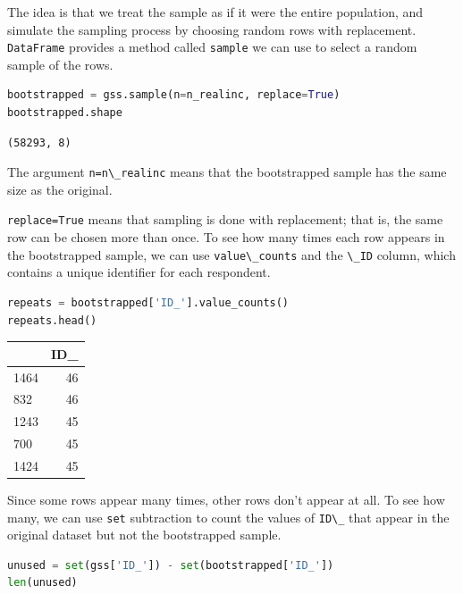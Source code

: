 The idea is that we treat the sample as if it were the entire
population, and simulate the sampling process by choosing random rows
with replacement. \passthrough{\lstinline!DataFrame!} provides a method
called \passthrough{\lstinline!sample!} we can use to select a random
sample of the rows.

\begin{lstlisting}[language=Python]
bootstrapped = gss.sample(n=n_realinc, replace=True)
bootstrapped.shape
\end{lstlisting}

\begin{lstlisting}[]
(58293, 8)
\end{lstlisting}

The argument \passthrough{\lstinline!n=n\_realinc!} means that the
bootstrapped sample has the same size as the original.

\passthrough{\lstinline!replace=True!} means that sampling is done with
replacement; that is, the same row can be chosen more than once. To see
how many times each row appears in the bootstrapped sample, we can use
\passthrough{\lstinline!value\_counts!} and the
\passthrough{\lstinline!\_ID!} column, which contains a unique
identifier for each respondent.

\begin{lstlisting}[language=Python]
repeats = bootstrapped['ID_'].value_counts()
repeats.head()
\end{lstlisting}

\begin{tabular}{lr}
\toprule
{} &  ID\_ \\
\midrule
1464 &   46 \\
832  &   46 \\
1243 &   45 \\
700  &   45 \\
1424 &   45 \\
\bottomrule
\end{tabular}

Since some rows appear many times, other rows don't appear at all. To
see how many, we can use \passthrough{\lstinline!set!} subtraction to
count the values of \passthrough{\lstinline!ID\_!} that appear in the
original dataset but not the bootstrapped sample.

\begin{lstlisting}[language=Python]
unused = set(gss['ID_']) - set(bootstrapped['ID_'])
len(unused)
\end{lstlisting}

